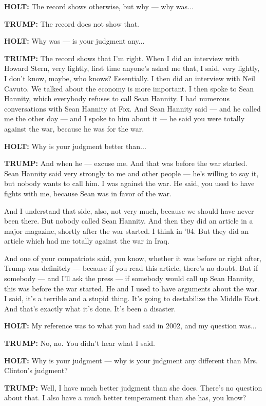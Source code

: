 \textbf{HOLT:} The record shows otherwise, but why --- why was...

\textbf{TRUMP:} The record does not show that.

\textbf{HOLT:} Why was --- is your judgment any...

\textbf{TRUMP:} The record shows that I'm right. When I did an interview
with Howard Stern, very lightly, first time anyone's asked me that, I
said, very lightly, I don't know, maybe, who knows? Essentially. I then
did an interview with Neil Cavuto. We talked about the economy is more
important. I then spoke to Sean Hannity, which everybody refuses to call
Sean Hannity. I had numerous conversations with Sean Hannity at Fox. And
Sean Hannity said --- and he called me the other day --- and I spoke to
him about it --- he said you were totally against the war, because he
was for the war.

\textbf{HOLT:} Why is your judgment better than...

\textbf{TRUMP:} And when he --- excuse me. And that was before the war
started. Sean Hannity said very strongly to me and other people --- he's
willing to say it, but nobody wants to call him. I was against the war.
He said, you used to have fights with me, because Sean was in favor of
the war.

And I understand that side, also, not very much, because we should have
never been there. But nobody called Sean Hannity. And then they did an
article in a major magazine, shortly after the war started. I think in
'04. But they did an article which had me totally against the war in
Iraq.

And one of your compatriots said, you know, whether it was before or
right after, Trump was definitely --- because if you read this article,
there's no doubt. But if somebody --- and I'll ask the press --- if
somebody would call up Sean Hannity, this was before the war started. He
and I used to have arguments about the war. I said, it's a terrible and
a stupid thing. It's going to destabilize the Middle East. And that's
exactly what it's done. It's been a disaster.

\textbf{HOLT:} My reference was to what you had said in 2002, and my
question was...

\textbf{TRUMP:} No, no. You didn't hear what I said.

\textbf{HOLT:} Why is your judgment --- why is your judgment any
different than Mrs. Clinton's judgment?

\textbf{TRUMP:} Well, I have much better judgment than she does. There's
no question about that. I also have a much better temperament than she
has, you know?

